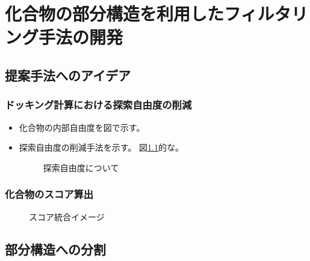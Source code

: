 \chapter{化合物の部分構造を利用したフィルタリング手法の開発}


\section{提案手法へのアイデア}
\subsection{ドッキング計算における探索自由度の削減}
\begin{itemize}
\item 化合物の内部自由度を図で示す。
\item 探索自由度の削減手法を示す。 図\ref{fig:docking_freedom}的な。
\begin{figure}[htb]
 \begin{center}
  \caption{探索自由度について}
  \label{fig:docking_freedom}
 \end{center}
\end{figure}

\end{itemize}

\subsection{化合物のスコア算出}

\begin{figure}[htb]
 \begin{center}
  \caption{スコア統合イメージ}
  \label{fig:integration_image}
 \end{center}
\end{figure}

\section{部分構造への分割}


